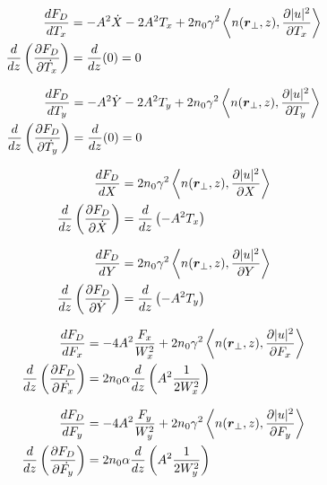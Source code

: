 \begin{equation}
\begin{split}
    \frac{d{F_{D}}}{d{T_x}} & = -A^2 \dot{X} - 2A^2 T_x  + 2n_0 \gamma^2 \left<n(\mbox{\boldmath{$r$}}_{\perp},z), \frac{\partial |u|^2}{\partial T_{x}}\right>\\
\frac{d{}}{d{z}}\left(\frac{\partial F_{D}}{\partial \dot{T_x}}\right) &= \frac{d{}}{d{z}}(0) = 0 
\end{split}
\end{equation}

\begin{equation}
\begin{split}
    \frac{d{F_{D}}}{d{T_y}} & = -A^2 \dot{Y} - 2A^2 T_y  + 2n_0 \gamma^2 \left<n(\mbox{\boldmath{$r$}}_{\perp},z), \frac{\partial |u|^2}{\partial T_{y}}\right>\\
\frac{d{}}{d{z}}\left(\frac{\partial F_{D}}{\partial \dot{T_y}}\right) &= \frac{d{}}{d{z}}(0) = 0 
\end{split}
\end{equation}


\begin{equation}
\begin{split}
    \frac{d{F_{D}}}{d{X}} & = 2n_0 \gamma^2 \left<n(\mbox{\boldmath{$r$}}_{\perp},z), \frac{\partial |u|^2}{\partial X}\right>\\
\frac{d{}}{d{z}}\left(\frac{\partial F_{D}}{\partial \dot{X}}\right) &= \frac{d{}}{d{z}}\left(-A^2 T_x \right)
\end{split}
\end{equation}

\begin{equation}
\begin{split}
    \frac{d{F_{D}}}{d{Y}} & = 2n_0 \gamma^2 \left<n(\mbox{\boldmath{$r$}}_{\perp},z), \frac{\partial |u|^2}{\partial Y}\right>\\
\frac{d{}}{d{z}}\left(\frac{\partial F_{D}}{\partial \dot{Y}}\right) &= \frac{d{}}{d{z}}\left(-A^2 T_y \right)
\end{split}
\end{equation}


\begin{equation}
\begin{split}
    \frac{d{F_{D}}}{d{F_x}}  &=  - 4 A^2 \frac{F_{x}}{W_{x}^2} + 2n_0 \gamma^2 \left<n(\mbox{\boldmath{$r$}}_{\perp},z),\frac{\partial |u|^2}{\partial F_x}\right> \\
    \frac{d{}}{d{z}}\left(\frac{\partial F_{D}}{\partial \dot{F_x}}\right) &= 2 n_0 \alpha \frac{d{}}{d{z}}\left(A^2 \frac{1}{2W_{x}^2} \right)
\end{split}
\end{equation}

\begin{equation}
\begin{split}
    \frac{d{F_{D}}}{d{F_y}}  &=  - 4 A^2 \frac{F_{y}}{W_{y}^2} + 2n_0 \gamma^2 \left<n(\mbox{\boldmath{$r$}}_{\perp},z),\frac{\partial |u|^2}{\partial F_y}\right> \\
    \frac{d{}}{d{z}}\left(\frac{\partial F_{D}}{\partial \dot{F_y}}\right) &= 2 n_0 \alpha  \frac{d{}}{d{z}}\left(A^2 \frac{1}{2W_{y}^2} \right)
\end{split}
\end{equation}

